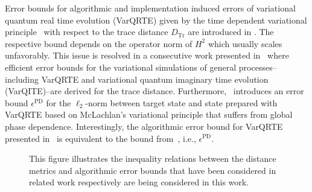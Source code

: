 \documentclass[twocolumn, aps, pra, superscriptaddress]{revtex4-1}
\begin{document}
Error bounds for algorithmic and implementation induced errors of variational quantum real time evolution (VarQRTE) given by the time dependent variational principle~\cite{dirac_1930TDVP} with respect to the trace distance $D_{\mathrm{Tr}}$ are introduced in \cite{EfficientVarQuantumSimErrorMinBenjamin17}. The respective bound depends on the operator norm of $H^2$ which usually scales unfavorably. This issue is resolved in a consecutive work presented in~\cite{Endo_2020VarQTEGeneralProcesses} where efficient error bounds for the variational simulations of general processes--including VarQRTE and variational quantum imaginary time evolution (VarQITE)--are derived for the trace distance.
Furthermore,~\cite{MartinazzoErrorVarQuantumDyn20} introduces an error bound $\epsilon^{\text{PD}}$ for the $\ell_2$-norm between target state and state prepared with VarQRTE based on McLachlan's variational principle \cite{McLachlan64} that suffers from global phase dependence.
Interestingly, the algorithmic error bound for VarQRTE presented in~\cite{Endo_2020VarQTEGeneralProcesses} is equivalent to the bound from~\cite{MartinazzoErrorVarQuantumDyn20}, i.e., $\epsilon^{\text{PD}}$. 

\begin{figure}[h!]
\captionsetup{singlelinecheck = false, format= hang, justification=centerlast, font=footnotesize, labelsep=space}
\begin{center}
\end{center}
\caption{This figure illustrates the inequality relations between the distance metrics and algorithmic error bounds that have been considered in related work respectively are being considered in this work.}
\label{fig:inequalities}
\end{figure}
\end{document}
